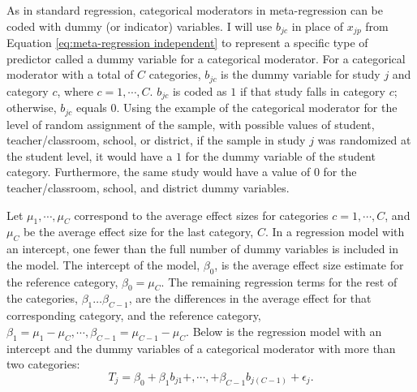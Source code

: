 As in standard regression, categorical moderators in meta-regression can be coded with dummy (or indicator) variables. I will use $b_{jc}$ in place of $x_{jp}$ from Equation \ref{eq:meta-regression independent} to represent a specific type of predictor called a dummy variable for a categorical moderator. For a categorical moderator with a total of $C$ categories, $b_{jc}$ is the dummy variable for study $j$ and category $c$, where $c = 1, \cdots, C$. $b_{jc}$ is coded as $1$ if that study falls in category $c$; otherwise, $b_{jc}$ equals $0$. Using the example of the categorical moderator for the level of random assignment of the sample, with possible values of student, teacher/classroom, school, or district, if the sample in study $j$ was randomized at the student level, it would have a $1$ for the dummy variable of the student category. Furthermore, the same study would have a value of $0$ for the teacher/classroom, school, and district dummy variables.  

Let $\mu_1, \cdots, \mu_{C}$ correspond to the average effect sizes for categories $c = 1, \cdots, C$, and $\mu_C$ be the average effect size for the last category, $C$. In a regression model with an intercept, one fewer than the full number of dummy variables is included in the model. 
The intercept of the model, $\beta_0$, is the average effect size estimate for the reference category, $\beta_0 = \mu_C$. The remaining regression terms for the rest of the categories, $\beta_1 \dots \beta_{C-1}$, are the differences in the average effect for that corresponding category, and the reference category, $\beta_1 = \mu_1 - \mu_C, \cdots, \beta_{C-1} = \mu_{C-1} - \mu_C$. Below is the regression model with an intercept and the dummy variables of a categorical moderator with more than two categories:
\begin{equation} \label{eq:intercept-category}
    T_j = \beta_0 + \beta_1 b_{j1} +, \cdots, +   \beta_{C-1}  b_{j(C-1)} 
    +\epsilon_j.
\end{equation}



